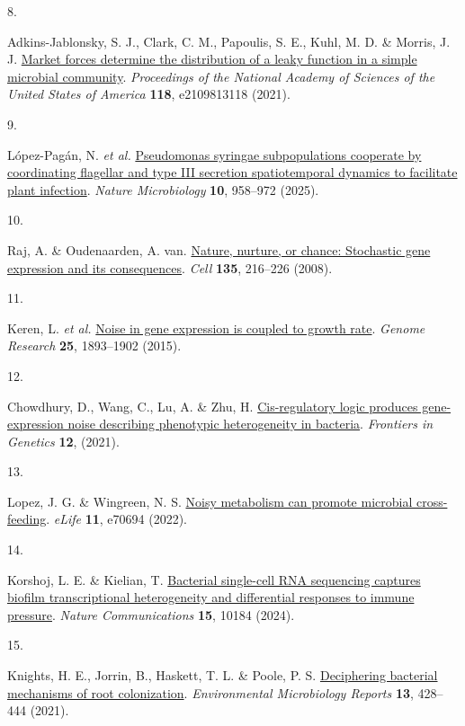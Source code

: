 \documentclass[
  11pt,
  a4paper,
]{report}
\newlength{\cslhangindent}
\newlength{\csllabelwidth}
\newenvironment{CSLReferences}[2] %
 {\begin{list}{}{%
  \setlength{\itemindent}{0pt}
  \setlength{\leftmargin}{0pt}
  \setlength{\parsep}{0pt}
  \ifodd #1
   \setlength{\leftmargin}{\cslhangindent}
   \setlength{\itemindent}{-1\cslhangindent}
  \fi
  \setlength{\itemsep}{#2\baselineskip}}}
 {\end{list}}
\newcommand{\CSLLeftMargin}[1]{\parbox[t]{\csllabelwidth}{\strut#1\strut}}
\newcommand{\CSLRightInline}[1]{\parbox[t]{\linewidth - \csllabelwidth}{\strut#1\strut}}
\begin{document}
\begin{CSLReferences}{0}{0}
\CSLLeftMargin{8. }%
\CSLRightInline{Adkins-Jablonsky, S. J., Clark, C. M., Papoulis, S. E.,
Kuhl, M. D. \& Morris, J. J.
\href{https://doi.org/10.1073/pnas.2109813118}{Market forces determine
the distribution of a leaky function in a simple microbial community}.
\emph{Proceedings of the National Academy of Sciences of the United
States of America} \textbf{118}, e2109813118 (2021).}

\CSLLeftMargin{9. }%
\CSLRightInline{López-Pagán, N. \emph{et al.}
\href{https://doi.org/10.1038/s41564-025-01966-0}{Pseudomonas syringae
subpopulations cooperate by coordinating flagellar and type III
secretion spatiotemporal dynamics to facilitate plant infection}.
\emph{Nature Microbiology} \textbf{10}, 958--972 (2025).}

\CSLLeftMargin{10. }%
\CSLRightInline{Raj, A. \& Oudenaarden, A. van.
\href{https://doi.org/10.1016/j.cell.2008.09.050}{Nature, nurture, or
chance: Stochastic gene expression and its consequences}. \emph{Cell}
\textbf{135}, 216--226 (2008).}

\CSLLeftMargin{11. }%
\CSLRightInline{Keren, L. \emph{et al.}
\href{https://doi.org/10.1101/gr.191635.115}{Noise in gene expression is
coupled to growth rate}. \emph{Genome Research} \textbf{25}, 1893--1902
(2015).}

\CSLLeftMargin{12. }%
\CSLRightInline{Chowdhury, D., Wang, C., Lu, A. \& Zhu, H.
\href{https://doi.org/10.3389/fgene.2021.698910}{Cis-regulatory logic
produces gene-expression noise describing phenotypic heterogeneity in
bacteria}. \emph{Frontiers in Genetics} \textbf{12}, (2021).}

\CSLLeftMargin{13. }%
\CSLRightInline{Lopez, J. G. \& Wingreen, N. S.
\href{https://doi.org/10.7554/eLife.70694}{Noisy metabolism can promote
microbial cross-feeding}. \emph{eLife} \textbf{11}, e70694 (2022).}

\CSLLeftMargin{14. }%
\CSLRightInline{Korshoj, L. E. \& Kielian, T.
\href{https://doi.org/10.1038/s41467-024-54581-8}{Bacterial single-cell
RNA sequencing captures biofilm transcriptional heterogeneity and
differential responses to immune pressure}. \emph{Nature Communications}
\textbf{15}, 10184 (2024).}

\CSLLeftMargin{15. }%
\CSLRightInline{Knights, H. E., Jorrin, B., Haskett, T. L. \& Poole, P.
S. \href{https://doi.org/10.1111/1758-2229.12934}{Deciphering bacterial
mechanisms of root colonization}. \emph{Environmental Microbiology
Reports} \textbf{13}, 428--444 (2021).}


\end{CSLReferences}
\end{document}
